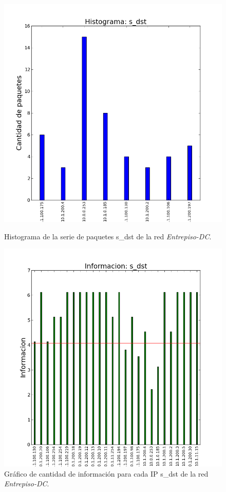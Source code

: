 \documentclass[10pt, a4paper]{article}
\begin{document}
\begin{figure}[H]
  \begin{minipage}{0.48\linewidth}
    \includegraphics[width=\linewidth]{../imgs/entrepiso-dc-ips_s_dst_hist.png}
    \caption{Histograma de la serie de paquetes s\_dst de la red \emph{Entrepiso-DC}.}
    \label{fig:histograma-entrepiso-dc-s-dst}
  \end{minipage}
\hfill
  \begin{minipage}{0.48\linewidth}
    \includegraphics[width=\linewidth]{../imgs/entrepiso-dc-ips_s_dst_info.png}
    \caption{Gráfico de cantidad de información para cada IP s\_dst de la red \emph{Entrepiso-DC}.}
    \label{fig:informacion-entrepiso-dc-s-dst}
  \end{minipage}
\end{figure}
\end{document}
